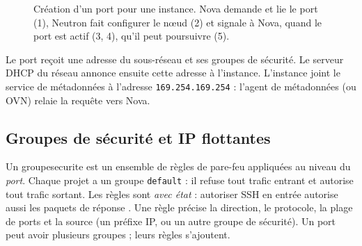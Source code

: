 \begin{figure}[!ht]
\centering
{}
\caption{Création d'un port pour une instance. Nova demande et lie le port (1), Neutron fait configurer le nœud (2) et
signale à Nova, quand le port est actif (3, 4), qu'il peut poursuivre (5).}
\label{fig:neu-seq}
\end{figure}

Le port reçoit une adresse du sous-réseau et ses groupes de sécurité. Le serveur DHCP du réseau annonce ensuite cette
adresse à l'instance. L'instance joint le service de métadonnées à l'adresse \texttt{169.254.169.254} : l'agent de
métadonnées (ou OVN) relaie la requête vers Nova.

\subsection{Groupes de sécurité et IP flottantes}\label{sec:neu-securite}

Un \gls{groupesecurite} est un ensemble de règles de pare-feu appliquées au niveau du \emph{port}. Chaque projet a un
groupe \texttt{default} : il refuse tout trafic entrant et autorise tout trafic sortant. Les règles sont \emph{avec état} :
autoriser SSH en entrée autorise aussi les paquets de réponse \parencite{neutron-intro}. Une règle précise la direction, le
protocole, la plage de ports et la source (un préfixe IP, ou un autre groupe de sécurité). Un port peut avoir plusieurs
groupes ; leurs règles s'ajoutent.


